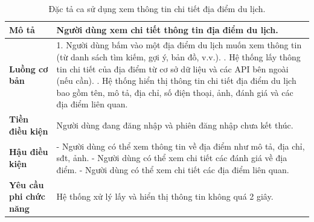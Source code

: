 \begin{longtable}{| p{4cm} | p{\dimexpr\linewidth-4cm-4\tabcolsep} |} %
    \caption{Đặc tả ca sử dụng xem thông tin chi tiết địa điểm du lịch.} %
    \label{tab:uc_view_place_details_spec} \\ %

    \hline
    \textbf{Mô tả} & Người dùng xem chi tiết thông tin địa điểm du lịch. \\
    \hline
    \endfirsthead %



    \hline %
    \endlastfoot

    \textbf{Luồng cơ bản} & 1. Người dùng bấm vào một địa điểm du lịch muốn xem thông tin (từ danh sách tìm kiếm, gợi ý, bản đồ, v.v.). \newline
                           2. Hệ thống lấy thông tin chi tiết của địa điểm từ cơ sở dữ liệu và các API bên ngoài (nếu cần). \newline
                           3. Hệ thống hiển thị thông tin chi tiết địa điểm du lịch bao gồm tên, mô tả, địa chỉ, số điện thoại, ảnh, đánh giá và các địa điểm liên quan. \\
    \hline
    \textbf{Tiền điều kiện} & Người dùng đang đăng nhập và phiên đăng nhập chưa kết thúc. \\
    \hline
    \textbf{Hậu điều kiện} & - Người dùng có thể xem thông tin về địa điểm như mô tả, địa chỉ, sđt, ảnh. \newline
                           - Người dùng có thể xem chi tiết các đánh giá về địa điểm. \newline
                           - Người dùng có thể xem chi tiết các địa điểm liên quan. \\
    \hline
    \textbf{Yêu cầu phi chức năng} & Hệ thống xử lý lấy và hiển thị thông tin không quá 2 giây. \\

\end{longtable}
\vspace{0.8cm}

